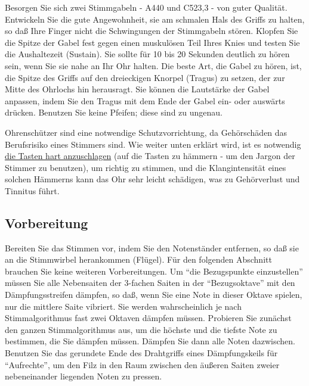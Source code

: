 \label{c2_3_gabel}

Besorgen Sie sich zwei Stimmgabeln - A440 und C523,3 - von guter Qualität.
Entwickeln Sie die gute Angewohnheit, sie am schmalen Hals des Griffs zu halten, so daß Ihre Finger nicht die Schwingungen der Stimmgabeln stören.
Klopfen Sie die Spitze der Gabel fest gegen einen muskulösen Teil Ihres Knies und testen Sie die Aushaltezeit (Sustain).
Sie sollte für 10 bis 20 Sekunden deutlich zu hören sein, wenn Sie sie nahe an Ihr Ohr halten.
Die beste Art, die Gabel zu hören, ist, die Spitze des Griffs auf den dreieckigen Knorpel (Tragus) zu setzen, der zur Mitte des Ohrlochs hin herausragt.
Sie können die Lautstärke der Gabel anpassen, indem Sie den Tragus mit dem Ende der Gabel ein- oder auswärts drücken.
Benutzen Sie keine Pfeifen; diese sind zu ungenau.

Ohrenschützer sind eine notwendige Schutzvorrichtung, da Gehörschäden das Berufsrisiko eines Stimmers sind.
Wie weiter unten erklärt wird, ist es notwendig \hyperref[c2_5_infi]{die Tasten hart anzuschlagen} (auf die Tasten zu hämmern - um den Jargon der Stimmer zu benutzen), um richtig zu stimmen, und die Klangintensität eines solchen Hämmerns kann das Ohr sehr leicht schädigen, was zu Gehörverlust und Tinnitus führt.
 

\subsection{Vorbereitung}
\label{c2_4}

Bereiten Sie das Stimmen vor, indem Sie den Notenständer entfernen, so daß sie an die Stimmwirbel herankommen (Flügel).
Für den folgenden Abschnitt brauchen Sie keine weiteren Vorbereitungen.
Um \enquote{die Bezugspunkte einzustellen} müssen Sie alle Nebensaiten der 3-fachen Saiten in der \enquote{Bezugsoktave} mit den Dämpfungsstreifen dämpfen, so daß, wenn Sie eine Note in dieser Oktave spielen, nur die mittlere Saite vibriert.
Sie werden wahrscheinlich je nach Stimmalgorithmus fast zwei Oktaven dämpfen müssen.
Probieren Sie zunächst den ganzen Stimmalgorithmus aus, um die höchste und die tiefste Note zu bestimmen, die Sie dämpfen müssen.
Dämpfen Sie dann alle Noten dazwischen.
Benutzen Sie das gerundete Ende des Drahtgriffs eines Dämpfungskeils für \enquote{Aufrechte}, um den Filz in den Raum zwischen den äußeren Saiten zweier nebeneinander liegenden Noten zu pressen.
 


